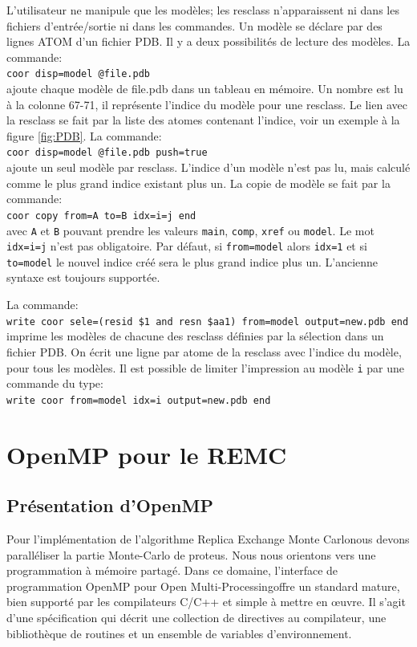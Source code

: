 L'utilisateur ne manipule que les modèles; les resclass n'apparaissent ni dans les fichiers d'entrée/sortie ni dans les commandes. Un modèle se déclare par des lignes ATOM d'un fichier PDB. Il y a deux possibilités de lecture des modèles. La commande:\\
\verb!coor disp=model @file.pdb!\\
ajoute chaque modèle de file.pdb dans un tableau en mémoire. Un nombre est lu à la colonne 67-71, il représente l'indice du modèle pour une resclass. Le lien avec la resclass se fait par la liste des atomes contenant l'indice, voir un exemple à la figure \ref{fig:PDB}. La commande:\\
\verb!coor disp=model @file.pdb push=true!\\
ajoute un seul modèle par resclass. L'indice d'un modèle n'est pas lu, mais calculé comme le plus grand indice existant plus un. 
La copie de modèle se fait par la commande:\\
\verb!coor copy from=A to=B idx=i=j end!\\
avec \verb!A! et \verb!B!  pouvant prendre les valeurs \verb!main!, \verb!comp!, \verb!xref! ou \verb!model!.
Le mot \verb!idx=i=j! n'est pas obligatoire. Par défaut, si \verb!from=model! alors \verb!idx=1! et si \verb!to=model! le nouvel indice créé sera le plus grand indice plus un. L'ancienne syntaxe est toujours supportée.

La commande:\\ 
\verb!write coor sele=(resid $1 and resn $aa1) from=model output=new.pdb end!\\
imprime les modèles de chacune des resclass définies par la sélection dans un fichier PDB. On écrit une ligne par atome de la resclass avec l'indice du modèle, pour tous les modèles. 
Il est possible de limiter l'impression au modèle \verb!i! par une commande du type:\\
\verb!write coor from=model idx=i output=new.pdb end!\\

\section{OpenMP pour le REMC}
\subsection{Présentation d'OpenMP}

Pour l'implémentation de l'algorithme \og Replica Exchange Monte Carlo\fg nous devons paralléliser la partie Monte-Carlo de proteus. Nous nous orientons vers une programmation à mémoire partagé. Dans ce domaine, l'interface de programmation OpenMP pour \og Open Multi-Processing\fg  offre un standard mature, bien supporté par les compilateurs C/C++ et simple à mettre en œuvre. Il s'agit d'une spécification qui décrit une collection de directives au compilateur, une bibliothèque de routines et un ensemble de variables d'environnement. 

